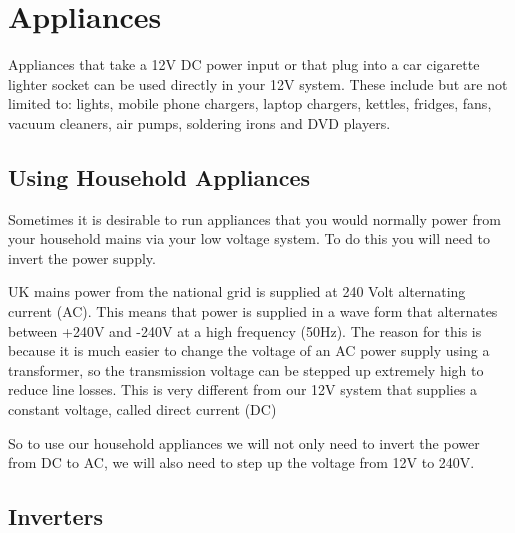 \documentclass{article}
\theoremstyle{definition}
\theoremstyle{definition}
\theoremstyle{remark}
\begin{document}


\section{Appliances} %
\label{sec:appliances}

  Appliances that take a 12V DC power input or that plug into a car cigarette lighter socket can be used directly in your 12V system. These include but are not limited to: lights, mobile phone chargers, laptop chargers, kettles, fridges, fans, vacuum cleaners, air pumps, soldering irons and DVD players. 

  \subsection{Using Household Appliances} %
  \label{sub:using_household_appliances}

    Sometimes it is desirable to run appliances that you would normally power from your household mains via your low voltage system. To do this you will need to invert the power supply.

    UK mains power from the national grid is supplied at 240 Volt alternating current (AC). This means that power is supplied in a wave form that alternates between +240V and -240V at a high frequency (50Hz). The reason for this is because it is much easier to change the voltage of an AC power supply using a transformer, so the transmission voltage can be stepped up extremely high to reduce line losses. This is very different from our 12V system that supplies a constant voltage, called direct current (DC)

    So to use our household appliances we will not only need to invert the power from DC to AC, we will also need to step up the voltage from 12V to 240V.
  

  \subsection{Inverters} %
  \label{sub:inverters}
\end{document}
